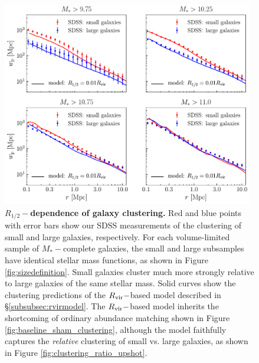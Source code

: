 \documentclass[usenatbib,usegraphicx,letterpaper]{mn2e}
\newcommand{\rhalf}{R_{1/2}}
\newcommand{\mstar}{M_{\ast}}
\newcommand{\rvir}{R_{\rm vir}}
\begin{document}
\begin{figure}
\centering
\includegraphics[width=11cm]{FIGS/rvir_only_wp_large_small_absolute.pdf}
\caption{
{\bf $\rhalf-$dependence of galaxy clustering.}
Red and blue points with error bars show our SDSS measurements of the clustering of small and large galaxies, respectively. For each volume-limited sample of $\mstar-$complete galaxies, the small and large subsamples have identical stellar mass functions, as shown in Figure \ref{fig:sizedefinition}. Small galaxies cluster much more strongly relative to large galaxies of the same stellar mass. Solid curves show the clustering predictions of the $\rvir-$based model described in \S\ref{subsubsec:rvirmodel}. The $\rvir-$based model inherits the shortcoming of ordinary abundance matching shown in Figure \ref{fig:baseline_sham_clustering}, although the model faithfully captures the {\em relative} clustering of small vs. large galaxies, as shown in Figure \ref{fig:clustering_ratio_upshot}.
}
\label{fig:rvir_only_clustering_absolute}
\end{figure}
\end{document}
